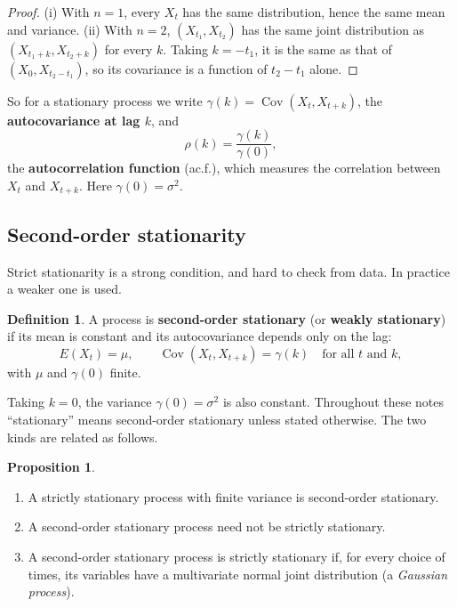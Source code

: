 \documentclass[11pt,a4paper]{article}
\theoremstyle{definition}
\newtheorem{defn}[thm]{Definition}
\newtheorem{prop}[thm]{Proposition}
\DeclareMathOperator{\Cov}{Cov}
\begin{document}
\begin{proof}
(i) With $n = 1$, every $X_t$ has the same distribution, hence the same mean and variance. (ii) With $n = 2$, $(X_{t_1}, X_{t_2})$ has
the same joint distribution as $(X_{t_1+k}, X_{t_2+k})$ for every $k$. Taking $k = -t_1$, it is the same as that of $(X_0, X_{t_2-t_1})$, so its
covariance is a function of $t_2 - t_1$ alone.
\end{proof}

So for a stationary process we write $\gamma(k) = \Cov(X_t, X_{t+k})$, the \textbf{autocovariance at lag $k$}, and
\[
\rho(k) = \frac{\gamma(k)}{\gamma(0)} ,
\]
the \textbf{autocorrelation function} (ac.f.), which measures the correlation between $X_t$ and $X_{t+k}$. Here $\gamma(0) = \sigma^2$.

\subsection{Second-order stationarity}
Strict stationarity is a strong condition, and hard to check from data. In practice a weaker one is used.

\begin{defn}
A process is \textbf{second-order stationary} (or \textbf{weakly stationary}) if its mean is constant and its
autocovariance depends only on the lag:
\[
E(X_t) = \mu , \qquad \Cov(X_t, X_{t+k}) = \gamma(k) \quad\text{for all } t \text{ and } k ,
\]
with $\mu$ and $\gamma(0)$ finite.
\end{defn}

Taking $k = 0$, the variance $\gamma(0) = \sigma^2$ is also constant. Throughout these notes ``stationary'' means second-order
stationary unless stated otherwise. The two kinds are related as follows.

\begin{prop}\label{prop:strict-weak}
\begin{enumerate}[label=(\roman*)]
\item A strictly stationary process with finite variance is second-order stationary.
\item A second-order stationary process need not be strictly stationary.
\item A second-order stationary process is strictly stationary if, for every choice of times, its
variables have a multivariate normal joint distribution (a \emph{Gaussian process}).
\end{enumerate}
\end{prop}
\end{document}
